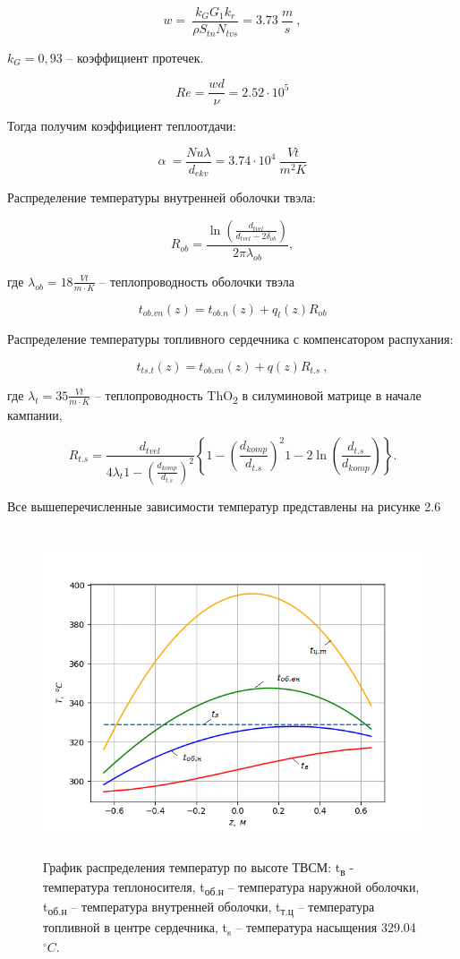 \[w = \ \frac{k_{G}G_{1}k_{r}}{\rho S_{tn}N_{tvs}} = 3.73\ \frac{m}{s}\ ,\]

\(k_{G} = 0,93\) -- коэффициент протечек.

\[Re = \frac{wd}{\nu} = 2.52 \cdot 10^{5}\]

Тогда получим коэффициент теплоотдачи:

\[\alpha\  = \frac{Nu\lambda}{d_{ekv}} = 3.74 \cdot 10^{4}\ \frac{Vt}{m^{2}K}\]

Распределение температуры внутренней оболочки твэла:

\[R_{ob} = \frac{\ln\left( \frac{d_{tvel}}{d_{tvel} - 2\delta_{ob}} \right)}{2\pi\lambda_{ob}},\]

где \(\lambda_{ob} = 18\frac{Vt}{m \cdot K}\) -- теплопроводность
оболочки твэла

\[t_{ob.vn}\left( z \right) = t_{ob.n}\left( z \right) + q_{l}\left( z \right)R_{ob}\]


Распределение температуры топливного сердечника с компенсатором
распухания:

\[t_{ts.t}\left( z \right) = t_{ob.vn}\left( z \right) + q\left( z \right)R_{t.s}\ ,\]

где \(\lambda_{t} = 35\frac{Vt}{m \cdot K}\) -- теплопроводность
ThO\textsubscript{2} в силуминовой матрице в начале кампании,

\[R_{t.s} = \frac{d_{tvel}}{4\lambda_{t} 1 - \left( \frac{d_{komp}}{d_{t.s}} \right)^{2} }\left\{ 1 - \left( \frac{d_{komp}}{d_{t.s}} \right)^{2} 1 - 2\ln\left( \frac{d_{t.s}}{d_{komp}} \right)  \right\}.\]

Все вышеперечисленные зависимости температур представлены на рисунке 2.6

\begin{figure}[!h]
\center
\includegraphics[width=5.11811in,height=3.80712in]{media/image10.png}
\caption{График распределения температур по высоте ТВСМ:
t­\textsubscript{в} - температура теплоносителя, t­\textsubscript{об.н}
-- температура наружной оболочки, t­\textsubscript{об.н} -- температура
внутренней оболочки, t­\textsubscript{т.ц} -- температура топливной в
центре сердечника, t­\textsubscript{s} -- температура насыщения 329.04
$^\circ C$.}
\end{figure}

